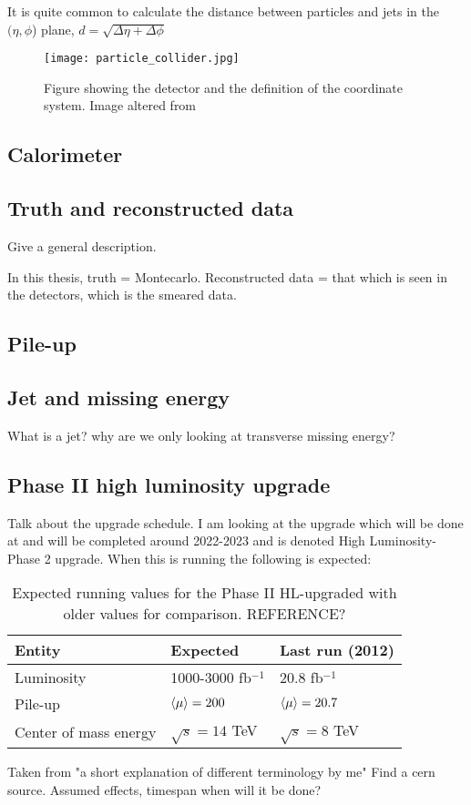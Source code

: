 It is quite common to calculate the distance between particles and jets in the $(\eta,\phi$) plane, $d=\sqrt{\Delta \eta + \Delta \phi}$  

\begin{figure}[ht]
\begin{center}
\texttt{[image: particle\_collider.jpg]}
\caption{Figure showing the \abbrATLAS detector and the definition of the coordinate system. Image altered from\citep{coordimage}}
\label{fig:coordinatesystem}
\end{center}
\end{figure}

\subsection{Calorimeter}
\subsection{Truth and reconstructed data}
Give a general description.

In this thesis, truth = Montecarlo. 
Reconstructed data = that which is seen in the detectors, which is the smeared data.
\subsection{Pile-up}\label{sec:experiment:subsec:pileup}
\subsection{Jet and missing energy}
What is a jet? why are we only looking at transverse missing energy? 

\subsection{Phase II high luminosity upgrade}
Talk about the upgrade schedule.
I am looking at the upgrade which will be done at \abbrCERN and will be completed around 2022-2023 and is denoted High Luminosity-\abbrLHC Phase 2 upgrade. When this is running the following is expected:
\begin{table}[H]
\begin{center}
    \begin{tabular}{ | l | l | l |}
    \hline
    Entity & Expected & Last run (2012) \\ \hline
  	Luminosity & 1000-3000 fb$^{-1}$ & 20.8 fb$^{-1}$ \\ \hline
  	Pile-up & $\left<\mu\right>=200$ & $\left<\mu\right>=20.7$ \\ \hline
  	Center of mass energy & $\sqrt{s}=14$ TeV &  $\sqrt{s}=8$ TeV \\ \hline
  	\end{tabular}
  	
  	\caption{Expected running values for the Phase II HL-upgraded \abbrLHC with older values for comparison. REFERENCE?}
  	\label{tab:expectvalues}
  	\end{center}
    \end{table}
Taken from "a short explanation of different terminology by me" Find a cern source.
Assumed effects, timespan when will it be done?

